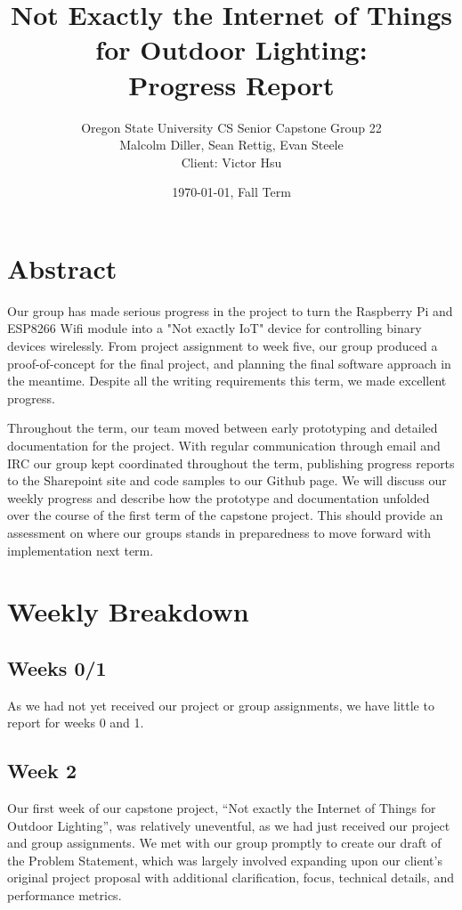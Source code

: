 \documentclass[letterpaper,10pt]{article}
\title{Not Exactly the Internet of Things for Outdoor Lighting:\\Progress Report}
\author{Oregon State University CS Senior Capstone Group 22\\
Malcolm Diller, Sean Rettig, Evan Steele\\
Client: Victor Hsu}
\date{\today, Fall Term}
\begin{document}
\maketitle

\section{Abstract}

Our group has made serious progress in the project to turn the Raspberry Pi and
ESP8266 Wifi module into a "Not exactly IoT" device for controlling binary
devices wirelessly. From project assignment to week five, our group produced a
proof-of-concept for the final project, and planning the final software
approach in the meantime. Despite all the writing requirements this term, we
made excellent progress.

Throughout the term, our team moved between early prototyping and detailed
documentation for the project. With regular communication through email and IRC
our group kept coordinated throughout the term, publishing progress reports to
the Sharepoint site and code samples to our Github page. We will discuss our
weekly progress and describe how the prototype and documentation unfolded over
the course of the first term of the capstone project. This should provide an
assessment on where our groups stands in preparedness to move forward with
implementation next term.

\pagebreak

\section{Weekly Breakdown}

\subsection{Weeks 0/1}

As we had not yet received our project or group assignments, we have little to
report for weeks 0 and 1.

\subsection{Week 2}

Our first week of our capstone project, ``Not exactly the Internet of Things
for Outdoor Lighting'', was relatively uneventful, as we had just received our
project and group assignments.  We met with our group promptly to create our
draft of the Problem Statement, which was largely involved expanding upon our
client's original project proposal with additional clarification, focus,
technical details, and performance metrics.
\end{document}
